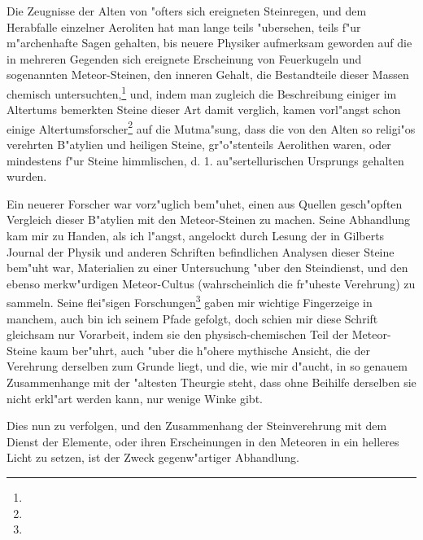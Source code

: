 \documentclass[a4paper, 11pt, oneside, polutonikogreek, german]{article}
\begin{document}
Die Zeugnisse der Alten von "ofters sich ereigneten Steinregen, und dem Herabfalle einzelner Aeroliten hat man lange teils "ubersehen, teils f"ur m"archenhafte Sagen gehalten, bis neuere Physiker aufmerksam geworden auf die in mehreren Gegenden sich ereignete Erscheinung von Feuerkugeln und sogenannten Meteor-Steinen, den inneren Gehalt, die Bestandteile dieser Massen chemisch untersuchten,\footnote{} und, indem man zugleich die Beschreibung einiger im Altertums bemerkten Steine dieser Art damit verglich, kamen vorl"angst schon einige Altertumsforscher\footnote{} auf die Mutma"sung, dass die von den Alten so religi"os verehrten B"atylien und heiligen Steine, gr"o"stenteils Aerolithen waren, oder mindestens f"ur Steine himmlischen, d. 1. au"sertellurischen Ursprungs gehalten wurden.

Ein neuerer Forscher war vorz"uglich bem"uhet, einen aus Quellen gesch"opften Vergleich dieser B"atylien mit den Meteor-Steinen zu machen. Seine Abhandlung kam mir zu Handen, als ich l"angst, angelockt durch Lesung der in Gilberts Journal der Physik und anderen Schriften befindlichen Analysen dieser Steine bem"uht war, Materialien zu einer Untersuchung "uber den Steindienst, und den ebenso merkw"urdigen Meteor-Cultus (wahrscheinlich die fr"uheste Verehrung) zu sammeln. Seine flei"sigen Forschungen\footnote{} gaben mir wichtige Fingerzeige in manchem, auch bin ich seinem Pfade gefolgt, doch schien mir diese Schrift gleichsam nur Vorarbeit, indem sie den physisch-chemischen Teil der Meteor-Steine kaum ber"uhrt, auch "uber die h"ohere mythische Ansicht, die der Verehrung derselben zum Grunde liegt, und die, wie mir d"aucht, in so genauem Zusammenhange mit der "altesten Theurgie steht, dass ohne Beihilfe derselben sie nicht erkl"art werden kann, nur wenige Winke gibt.

Dies nun zu verfolgen, und den Zusammenhang der Steinverehrung mit dem Dienst der Elemente, oder ihren Erscheinungen in den Meteoren in ein helleres Licht zu setzen, ist der Zweck gegenw"artiger Abhandlung.
\clearpage
\end{document}
